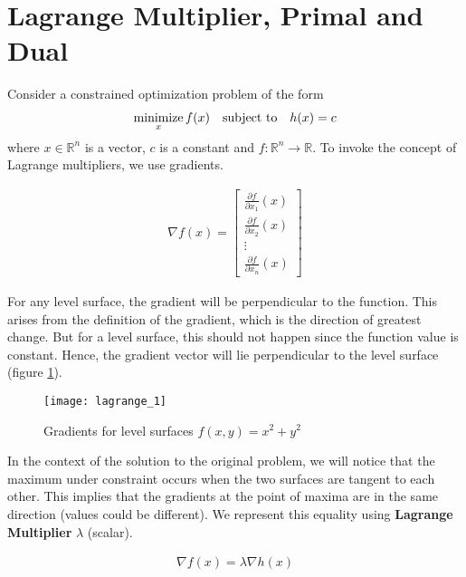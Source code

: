 \documentclass[../statistical_learning_notes.tex]{subfiles}
\begin{document}
\section{Lagrange Multiplier, Primal and Dual}\label{sec:appendix_lagrangian}

Consider a constrained optimization problem of the form
\begin{align*}
    \operatorname*{minimize}_{x} f(x) \quad \text{subject to} \quad h(x) = c
\end{align*}
where $x \in \mathbb{R}^{n}$ is a vector, $c$ is a constant and $f:\mathbb{R}^{n} \rightarrow \mathbb{R}$. To invoke the concept of Lagrange multipliers, we use gradients. 

\begin{align*}
    \nabla f(x) = 
        \begin{bmatrix}
        \frac{\partial f}{\partial x_{1}}(x)\\
        \frac{\partial f}{\partial x_{2}}(x)\\
        \vdots\\
        \frac{\partial f}{\partial x_{n}}(x)
    \end{bmatrix}
\end{align*}

For any level surface, the gradient will be perpendicular to the function. This arises from the definition of the gradient, which is the direction of greatest change. But for a level surface, this should not happen since the function value is constant. Hence, the gradient vector will lie perpendicular to the level surface (figure \ref{fig:lagrange_1}).

\begin{figure}[h]
    \texttt{[image: lagrange\_1]}
    \centering
    \caption {Gradients for level surfaces $f(x,y) = x^{2}+y^{2}$}
    \label{fig:lagrange_1} %
\end{figure}

In the context of the solution to the original problem, we will notice that the maximum under constraint occurs when the two surfaces are tangent to each other. This implies that the gradients at the point of maxima are in the same direction (values could be different). We represent this equality using \textbf{Lagrange Multiplier} $\lambda$ (scalar).

\begin{align*}
    \nabla f(x) = \lambda \nabla h(x)
\end{align*}
\end{document}
